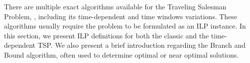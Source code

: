 There are multiple exact algorithms available for the Traveling Salesman Problem, \cite{tsp_exact_review}, including its time-dependent \cite{tdtwptw_exact} and time windows \cite{tsptw_exact_soloman} variations. These algorithms usually require the problem to be formulated as an \ac{ILP} instance. In this section, we present ILP definitions for both the classic and the time-dependent TSP. We also present a brief introduction regarding the Branch and Bound algorithm, often used to determine optimal or near optimal solutions.



